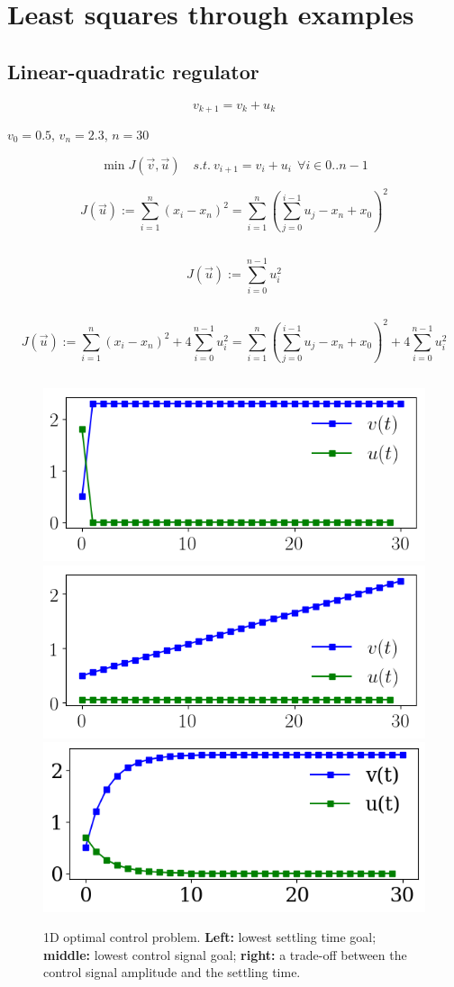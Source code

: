 \documentclass[notitlepage]{report}
\begin{document}
\chapter{Least squares through examples}

\section{Linear-quadratic regulator}

$$
v_{k+1} = v_k + u_k
$$

$v_0=0.5$, $v_n=2.3$, $n=30$

$$
\min J(\vec{v},\vec{u}) \quad s.t.~  v_{i+1} = v_i + u_i ~~ \forall i \in 0..n-1
$$


$$
J(\vec{u}) := \sum\limits_{i=1}^n (x_i-x_n)^2 = \sum\limits_{i=1}^n \left(\sum\limits_{j=0}^{i-1}u_j-x_n+x_0\right)^2
$$


\inputminted[frame=single,linenos=true]{python}{listings/example_6.1_a.py}

$$
J(\vec{u}) := \sum\limits_{i=0}^{n-1} u_i^2
$$


\inputminted[frame=single,linenos=true]{python}{listings/example_6.1_b.py}

$$
J(\vec{u}) := \sum\limits_{i=1}^n (x_i-x_n)^2 + 4\sum\limits_{i=0}^{n-1} u_i^2 = \sum\limits_{i=1}^n \left(\sum\limits_{j=0}^{i-1}u_j-x_n+x_0\right)^2 + 4\sum\limits_{i=0}^{n-1} u_i^2
$$

\inputminted[frame=single,linenos=true]{python}{listings/example_6.1_c.py}

\begin{figure}[ht]
    \centering
    \includegraphics[width=.32\linewidth]{example_6.1_a.png}
    \includegraphics[width=.32\linewidth]{example_6.1_b.png}
    \includegraphics[width=.32\linewidth]{example_6.1_c.png}
    \caption{1D optimal control problem. \textbf{Left:} lowest settling time goal; \textbf{middle:} lowest control signal goal; \textbf{right:} a trade-off between the control signal amplitude and the settling time.}
    \label{fig:lqr}
\end{figure}
\end{document}
